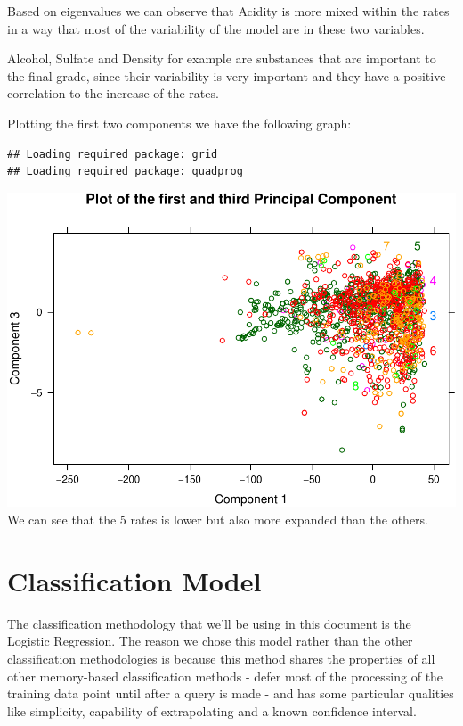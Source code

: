 \documentclass[]{article}
\begin{document}
Based on eigenvalues we can observe that Acidity is more mixed within
the rates in a way that most of the variability of the model are in
these two variables.

Alcohol, Sulfate and Density for example are substances that are
important to the final grade, since their variability is very important
and they have a positive correlation to the increase of the rates.

Plotting the first two components we have the following graph:

\begin{verbatim}
## Loading required package: grid
## Loading required package: quadprog
\end{verbatim}

\includegraphics{./Project_files/figure-latex/unnamed-chunk-14-1.pdf} We
can see that the 5 rates is lower but also more expanded than the
others.

\newpage

\section{Classification Model}\label{classification-model}

The classification methodology that we'll be using in this document is
the Logistic Regression. The reason we chose this model rather than the
other classification methodologies is because this method shares the
properties of all other memory-based classification methods - defer most
of the processing of the training data point until after a query is made
- and has some particular qualities like simplicity, capability of
extrapolating and a known confidence interval. \cite{log}
\end{document}
